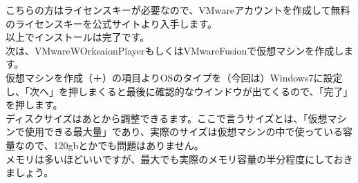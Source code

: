 \documentclass[b5paper,9pt,platex,dvipdfmx]{jsarticle}
\begin{document}
\begin{multicols*}{3}
こちらの方はライセンスキーが必要なので、VMwareアカウントを作成して無料のライセンスキーを公式サイトより入手します。\\
以上でインストールは完了です。\\
次は、VMwareWOrksaionPlayerもしくはVMwareFusionで仮想マシンを作成します。\\
仮想マシンを作成（＋）の項目よりOSのタイプを（今回は）Windows7に設定し、「次へ」を押しまくると最後に確認的なウインドウが出てくるので、「完了」を押します。\\
ディスクサイズはあとから調整できるます。ここで言うサイズとは、「仮想マシンで使用できる最大量」であり、実際のサイズは仮想マシンの中で使っている容量なので、120gbとかでも問題はありません。\\
メモリは多いほどいいですが、最大でも実際のメモリ容量の半分程度にしておきましょう。\\

\end{multicols*}
\end{document}
